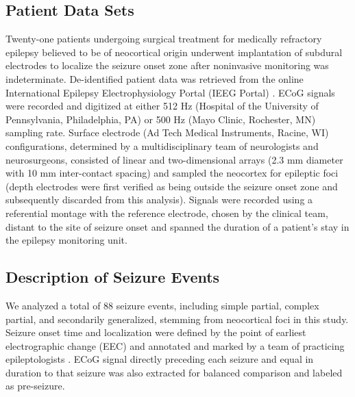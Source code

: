 \subsection{Patient Data Sets}
Twenty-one patients undergoing surgical treatment for medically refractory epilepsy believed to be of neocortical origin underwent implantation of subdural electrodes to localize the seizure onset zone after noninvasive monitoring was indeterminate. De-identified patient data was retrieved from the online International Epilepsy Electrophysiology Portal (IEEG Portal) \cite{wagenaar2013multimodal}. ECoG signals were recorded and digitized at either 512 Hz (Hospital of the University of Pennsylvania, Philadelphia, PA) or 500 Hz (Mayo Clinic, Rochester, MN) sampling rate. Surface electrode (Ad Tech Medical Instruments, Racine, WI) configurations, determined by a multidisciplinary team of neurologists and neurosurgeons, consisted of linear and two-dimensional arrays (2.3 mm diameter with 10 mm inter-contact spacing) and sampled the neocortex for epileptic foci (depth electrodes were first verified as being outside the seizure onset zone and subsequently discarded from this analysis). Signals were recorded using a referential montage with the reference electrode, chosen by the clinical team, distant to the site of seizure onset and spanned the duration of a patient's stay in the epilepsy monitoring unit.

\subsection{Description of Seizure Events}
We analyzed a total of 88 seizure events, including simple partial, complex partial, and secondarily generalized, stemming from neocortical foci in this study. Seizure onset time and localization were defined by the point of earliest electrographic change (EEC) and annotated and marked by a team of practicing epileptologists \cite{litt2001epileptic}. ECoG signal directly preceding each seizure and equal in duration to that seizure was also extracted for balanced comparison and labeled as pre-seizure.

